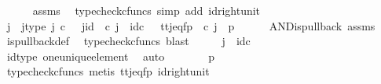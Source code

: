 \begin{isabellebody}
\ \ \ \ \isamarkupfalse%
\ assms\ \isamarkupfalse%
\ {\isacharparenleft}{\kern0pt}typecheck{\isacharunderscore}{\kern0pt}cfuncs{\isacharcomma}{\kern0pt}\ simp\ add{\isacharcolon}{\kern0pt}\ id{\isacharunderscore}{\kern0pt}right{\isacharunderscore}{\kern0pt}unit{}{\isacharparenright}{\kern0pt}\isanewline
\ \ \isamarkupfalse%
\ \isamarkupfalse%
\ j\ \ j{\isacharunderscore}{\kern0pt}type{\isacharcolon}{\kern0pt}\ {\isachardoublequoteopen}j\ {\isasymin}\isactrlsub c\ {\isasymone}{\isachardoublequoteclose}\ \ j{\isacharunderscore}{\kern0pt}id{\isacharcolon}{\kern0pt}\ {\isachardoublequoteopen}{\isasymbeta}\isactrlbsub {\isasymone}\isactrlesub \ {\isasymcirc}\isactrlsub c\ j\ {\isacharequal}{\kern0pt}\ id\isactrlsub c\ {\isasymone}{\isachardoublequoteclose}\ \ tt{\isacharunderscore}{\kern0pt}j{\isacharunderscore}{\kern0pt}eq{\isacharunderscore}{\kern0pt}fp{\isacharcolon}{\kern0pt}\ {\isachardoublequoteopen}{\isasymlangle}{\isasymt}{\isacharcomma}{\kern0pt}{\isasymt}{\isasymrangle}\ {\isasymcirc}\isactrlsub c\ j\ {\isacharequal}{\kern0pt}\ {\isasymlangle}{\isasymf}{\isacharcomma}{\kern0pt}p{\isasymrangle}{\isachardoublequoteclose}\isanewline
\ \ \ \ \isamarkupfalse%
\ AND{\isacharunderscore}{\kern0pt}is{\isacharunderscore}{\kern0pt}pullback\ assms\ \isamarkupfalse%
\ is{\isacharunderscore}{\kern0pt}pullback{\isacharunderscore}{\kern0pt}def\ \isamarkupfalse%
\ {\isacharparenleft}{\kern0pt}typecheck{\isacharunderscore}{\kern0pt}cfuncs{\isacharcomma}{\kern0pt}\ blast{\isacharparenright}{\kern0pt}\isanewline
\ \ \isamarkupfalse%
\ \isamarkupfalse%
\ {\isachardoublequoteopen}j\ {\isacharequal}{\kern0pt}\ id\isactrlsub c\ {\isasymone}{\isachardoublequoteclose}\isanewline
\ \ \ \ \isamarkupfalse%
\ id{\isacharunderscore}{\kern0pt}type\ one{\isacharunderscore}{\kern0pt}unique{\isacharunderscore}{\kern0pt}element\ \isamarkupfalse%
\ auto\isanewline
\ \ \isamarkupfalse%
\ \isamarkupfalse%
\ {\isachardoublequoteopen}{\isasymlangle}{\isasymt}{\isacharcomma}{\kern0pt}{\isasymt}{\isasymrangle}\ {\isacharequal}{\kern0pt}\ {\isasymlangle}{\isasymf}{\isacharcomma}{\kern0pt}p{\isasymrangle}{\isachardoublequoteclose}\isanewline
\ \ \ \ \isamarkupfalse%
\ {\isacharparenleft}{\kern0pt}typecheck{\isacharunderscore}{\kern0pt}cfuncs{\isacharcomma}{\kern0pt}\ metis\ tt{\isacharunderscore}{\kern0pt}j{\isacharunderscore}{\kern0pt}eq{\isacharunderscore}{\kern0pt}fp\ id{\isacharunderscore}{\kern0pt}right{\isacharunderscore}{\kern0pt}unit{}{\isacharparenright}{\kern0pt}\isanewline

\end{isabellebody}

